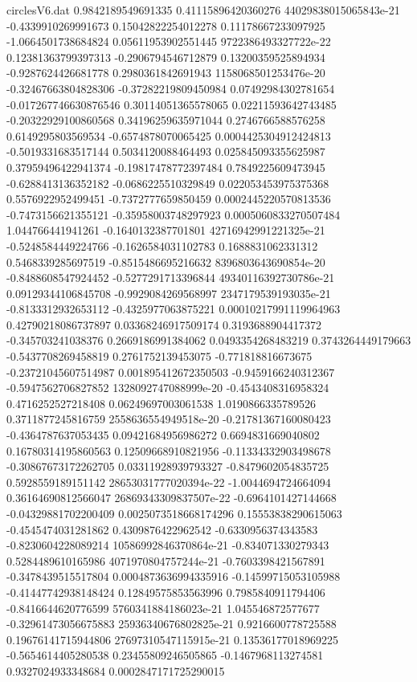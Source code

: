 \begin{filecontents}{circlesV6.dat}
0.9842189549691335	0.41115896420360276	44029838015065843e-21
-0.4339910269991673	0.15042822254012278	0.11178667233097925
-1.0664501738684824	0.05611953902551445	9722386493327722e-22
0.12381363799397313	-0.2906794546712879	0.13200359525894934
-0.9287624426681778	0.2980361842691943	1158068501253476e-20
-0.32467663804828306	-0.37282219809450984	0.07492984302781654
-0.017267746630876546	0.30114051365578065	0.02211593642743485
-0.20322929100860568	0.34196259635971044	0.2746766588576258
0.6149295803569534	-0.6574878070065425	0.0004425304912424813
-0.5019331683517144	0.5034120088464493	0.025845093355625987
0.37959496422941374	-0.19817478772397484	0.7849225609473945
-0.6288413136352182	-0.0686225510329849	0.022053453975375368
0.5576922952499451	-0.7372777659850459	0.0002445220570813536
-0.7473156621355121	-0.35958003748297923	0.0005060833270507484
1.044766441941261	-0.1640132387701801	42716942991221325e-21
-0.5248584449224766	-0.1626584031102783	0.1688831062331312
0.5468339285697519	-0.8515486695216632	8396803643690854e-20
-0.8488608547924452	-0.5277291713396844	49340116392730786e-21
0.09129344106845708	-0.9929084269568997	2347179539193035e-21
-0.8133312932653112	-0.4325977063875221	0.00010217991119964963
0.42790218086737897	0.03368246917509174	0.3193688904417372
-0.345703241038376	0.2669186991384062	0.0493354268483219
0.3743264449179663	-0.5437708269458819	0.2761752139453075
-0.771818816673675	-0.23721045607514987	0.001895412672350503
-0.9459166240312367	-0.5947562706827852	1328092747088999e-20
-0.4543408316958324	0.4716252527218408	0.06249697003061538
1.0190866335789526	0.3711877245816759	2558636554949518e-20
-0.21781367160080423	-0.4364787637053435	0.09421684956986272
0.6694831669040802	0.16780314195860563	0.12509668910821956
-0.11334332903498678	-0.30867673172262705	0.03311928939793327
-0.8479602054835725	0.5928559189151142	28653031777020394e-22
-1.0044694724664094	0.36164690812566047	26869343309837507e-22
-0.6964101427144668	-0.04329881702200409	0.0025073518668174296
0.15553838290615063	-0.4545474031281862	0.4309876422962542
-0.6330956374343583	-0.8230604228089214	10586992846370864e-21
-0.834071330279343	0.5284489610165986	4071970804757244e-21
-0.7603398421567891	-0.3478439515517804	0.0004873636994335916
-0.14599715053105988	-0.41447742938148424	0.12849575853563996
0.7985840911794406	-0.8416644620776599	5760341884186023e-21
1.045546872577677	-0.32961473056675883	25936340676802825e-21
0.9216600778725588	0.19676141715944806	27697310547115915e-21
0.13536177018969225	-0.5654614405280538	0.23455809246505865
-0.1467968113274581	0.9327024933348684	0.0002847171725290015

\end{filecontents}
